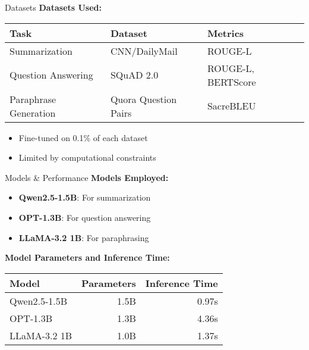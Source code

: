 \documentclass{beamer}
\begin{document}
\begin{frame}{Datasets}
\textbf{Datasets Used:}
\begin{scriptsize}
\begin{tabular}{@{}lll@{}}
\toprule
\textbf{Task} & \textbf{Dataset} & \textbf{Metrics} \\
\midrule
Summarization & CNN/DailyMail & ROUGE-L \\
Question Answering & SQuAD 2.0 & ROUGE-L, BERTScore \\
Paraphrase Generation & Quora Question Pairs & SacreBLEU \\
\bottomrule
\end{tabular}
\end{scriptsize}

\vspace{1em} %

\begin{itemize}
    \item Fine-tuned on 0.1\% of each dataset
    \item Limited by computational constraints
\end{itemize}
\end{frame}

\begin{frame}{Models & Performance}
\textbf{Models Employed:}
\begin{itemize}
    \item \textbf{Qwen2.5-1.5B}: For summarization
    \item \textbf{OPT-1.3B}: For question answering
    \item \textbf{LLaMA-3.2 1B}: For paraphrasing
\end{itemize}

\vspace{1em} %

\textbf{Model Parameters and Inference Time:}
\begin{scriptsize}
\begin{tabular}{@{}lrr@{}}
\toprule
\textbf{Model} & \textbf{Parameters} & \textbf{Inference Time} \\
\midrule
Qwen2.5-1.5B & 1.5B & 0.97s \\
OPT-1.3B & 1.3B & 4.36s \\
LLaMA-3.2 1B & 1.0B & 1.37s \\
\bottomrule
\end{tabular}
\end{scriptsize}
\end{frame}
\end{document}
